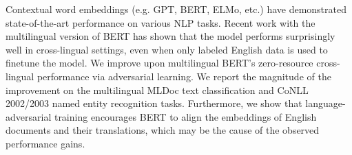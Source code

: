 Contextual word embeddings (e.g. GPT, BERT, ELMo, etc.) have demonstrated state-of-the-art performance on various NLP tasks. Recent work with the multilingual version of BERT has shown that the model performs surprisingly well in cross-lingual settings, even when only labeled English data is used to finetune the model. We improve upon multilingual BERT's zero-resource cross-lingual performance via adversarial learning. We report the magnitude of the improvement on the multilingual MLDoc text classification and CoNLL 2002/2003 named entity recognition tasks. Furthermore, we show that language-adversarial training encourages BERT to align the embeddings of English documents and their translations, which may be the cause of the observed performance gains.
